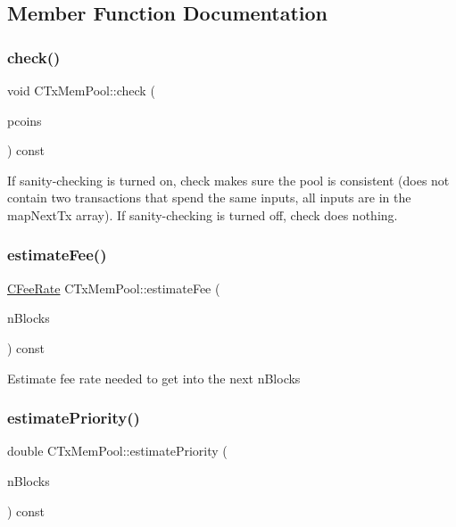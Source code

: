 \subsection{Member Function Documentation}
\mbox{\label{class_c_tx_mem_pool_ab30fadfa811829e79accca41da6a8328}} 
\subsubsection{\texorpdfstring{check()}{check()}}
{\footnotesize\ttfamily void C\+Tx\+Mem\+Pool\+::check (\begin{DoxyParamCaption}\item[{const \mbox{\hyperlink{class_c_coins_view_cache}{C\+Coins\+View\+Cache}} $\ast$}]{pcoins }\end{DoxyParamCaption}) const}

If sanity-\/checking is turned on, check makes sure the pool is consistent (does not contain two transactions that spend the same inputs, all inputs are in the map\+Next\+Tx array). If sanity-\/checking is turned off, check does nothing. \mbox{\label{class_c_tx_mem_pool_a32dd66c128330aed86865c8a61857c6c}} 
\subsubsection{\texorpdfstring{estimate\+Fee()}{estimateFee()}}
{\footnotesize\ttfamily \mbox{\hyperlink{class_c_fee_rate}{C\+Fee\+Rate}} C\+Tx\+Mem\+Pool\+::estimate\+Fee (\begin{DoxyParamCaption}\item[{int}]{n\+Blocks }\end{DoxyParamCaption}) const}

Estimate fee rate needed to get into the next n\+Blocks \mbox{\label{class_c_tx_mem_pool_a225378304025c093d2dc5fcb754ade3b}} 
\subsubsection{\texorpdfstring{estimate\+Priority()}{estimatePriority()}}
{\footnotesize\ttfamily double C\+Tx\+Mem\+Pool\+::estimate\+Priority (\begin{DoxyParamCaption}\item[{int}]{n\+Blocks }\end{DoxyParamCaption}) const}

